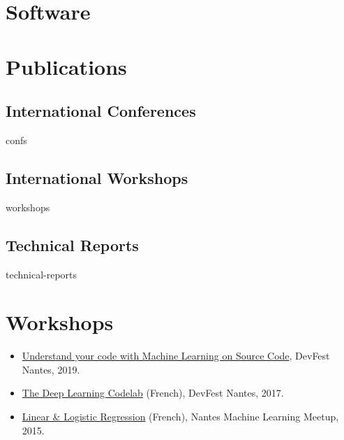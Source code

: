 \documentclass[11pt,a4paper]{moderncv}
\begin{document}
\section{Software}


\section{Publications}

\subsection{International Conferences}
\begin{btSect}{confs}
\btPrintNotCited
\end{btSect}

\subsection{International Workshops}
\begin{btSect}{workshops}
\btPrintNotCited
\end{btSect}

\subsection{Technical Reports}
\begin{btSect}{technical-reports}
\btPrintNotCited
\end{btSect}

\section{Workshops}

\begin{itemize}
\item \href{https://github.com/m09/deeplearning-codelab}{Understand
    your code with Machine Learning on Source Code}, DevFest Nantes,
  2019.
\item \href{https://github.com/m09/deeplearning-codelab}{The Deep
    Learning Codelab} (French), DevFest Nantes, 2017.
\item
  \href{https://github.com/nantes-machine-learning-meetup/NMLM/tree/master/2015-10-05__r\%C3\%A9gression-lin\%C3\%A9aire-logistique}{
    Linear \& Logistic Regression} (French), Nantes Machine
  Learning Meetup, 2015.
\end{itemize}
\end{document}
